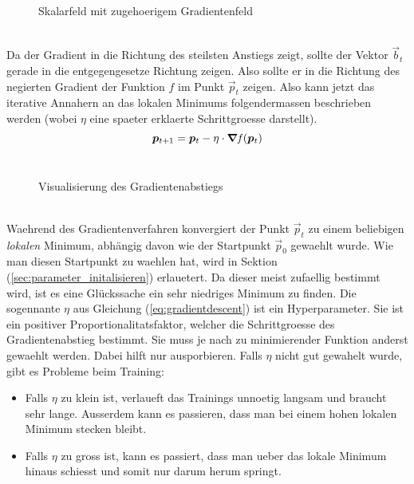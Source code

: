 \para{}
\begin{figure}[h!]
  \caption{Skalarfeld mit zugehoerigem Gradientenfeld}
\end{figure}
\\
Da der Gradient in die Richtung des steilsten Anstiegs zeigt, sollte der Vektor
$\vec{b}_t$ gerade in die entgegengesetze Richtung zeigen. Also sollte er in die Richtung des negierten Gradient der Funktion $f$ im Punkt $\vec{p}_t$ zeigen.
Also kann jetzt das iterative Annahern an das lokalen Minimums folgendermassen beschrieben
werden (wobei $\eta$ eine spaeter erklaerte Schrittgroesse darstellt).
\\
\begin{equation}\label{eq:gradientdescent}
  \bm{p}_{t+1} = \bm{p}_t - \eta \cdot \bm{\nabla} \mathit{f}(\bm{p}_t)
\end{equation}
\\
\begin{figure}[h!]
  \centering
  \caption{Visualisierung des Gradientenabstiegs}
\end{figure}
\\
Waehrend des Gradientenverfahren konvergiert der Punkt $\vec{p}_t$ zu einem
beliebigen \textit{lokalen} Minimum, abhängig davon wie der Startpunkt
$\vec{p}_0$ gewaehlt wurde.
Wie man diesen Startpunkt zu waehlen hat, wird in Sektion
(\ref{sec:parameter_initalisieren}) erlauetert.
Da dieser meist zufaellig bestimmt wird, ist es eine Glückssache ein sehr niedriges Minimum zu finden.
\para{}
Die sogennante  $\eta$ aus Gleichung (\ref{eq:gradientdescent}) ist ein Hyperparameter.
Sie ist ein positiver Proportionalitatsfaktor, welcher die Schrittgroesse des Gradientenabstieg bestimmt. Sie muss je nach zu minimierender Funktion anderst gewaehlt werden.
Dabei hilft nur ausporbieren. Falls $\eta$ nicht gut gewahelt wurde, gibt es Probleme beim Training:
\begin{itemize}
\item{Falls $\eta$ zu klein ist, verlaueft das Trainings unnoetig langsam und braucht sehr lange.
    Ausserdem kann es passieren, dass man bei einem hohen lokalen Minimum stecken bleibt.}

\item{Falls $\eta$ zu gross ist, kann es passiert, dass man ueber das lokale
    Minimum hinaus schiesst und somit nur darum herum springt.}
\end{itemize}
